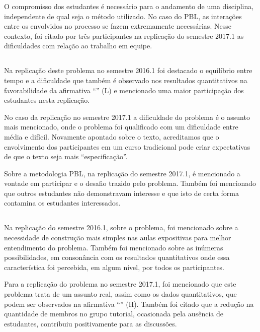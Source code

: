 O compromisso dos estudantes é necessário para
o andamento de uma disciplina, independente de qual seja
o método utilizado.
No caso do \ac{PBL}, as interações entre os envolvidos no processo
se fazem extremamente necessárias.
Nesse contexto,
foi citado por três participantes na replicação do semestre 2017.1 as dificuldades
com relação ao trabalho em equipe.

\subsection{\ProblemaC}

Na replicação deste problema no semestre 2016.1
foi destacado o equilíbrio entre tempo e a dificuldade
que também é observado nos resultados quantitativos
na favorabilidade da afirmativa ``\LikertPL'' (L)
e mencionado uma maior participação
dos estudantes nesta replicação.

No caso da replicação no semestre 2017.1 a dificuldade
do problema é o assunto mais mencionado, onde o problema foi
qualificado com um dificuldade entre média e difícil.
Novamente apontado sobre o texto, acreditamos que o
envolvimento dos participantes em um curso
tradicional pode criar expectativas de que o texto
seja mais ``especificação''.

Sobre a metodologia \ac{PBL}, na replicação do semestre 2017.1,
é mencionado a vontade em participar e o desafio trazido
pelo problema.
Também foi mencionado que outros estudantes não
demonstravam interesse e que isto de certa forma
contamina os estudantes interessados.

\subsection{\ProblemaD}

Na replicação do semestre 2016.1, sobre o problema, foi mencionado
sobre a necessidade de construção mais simples nas aulas
expositivas para melhor entendimento do problema.
Também foi mencionado sobre as inúmeras possibilidades, em consonância
com os resultados quantitativos onde essa característica foi
percebida, em algum nível, por todos os participantes.

Para a replicação do problema no semestre 2017.1, foi mencionado
que este problema trata de um assunto real, assim como
os dados quantitativos, que podem ser observados
na afirmativa ``\LikertPH'' (H).
Também foi citado que a redução na quantidade de membros no grupo
tutorial, ocasionada pela ausência de estudantes, contribuiu
positivamente para as discussões.

